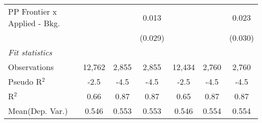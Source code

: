 \begin{tabular}{lcccccc}
   PP Frontier x Applied - Bkg.   &                &              & 0.013          &                &              & 0.023\\   
                                  &                &              & (0.029)        &                &              & (0.030)\\   
   \midrule
   \emph{Fit statistics}\\
   Observations                   & 12,762         & 2,855        & 2,855          & 12,434         & 2,760        & 2,760\\  
   Pseudo R$^2$                   & -2.5           & -4.5         & -4.5           & -2.5           & -4.5         & -4.5\\  
   R$^2$                          & 0.66           & 0.87         & 0.87           & 0.65           & 0.87         & 0.87\\  
Mean(Dep. Var.) & 0.546 & 0.553 & 0.553 & 0.546 & 0.554 & 0.554 \\
   

\end{tabular}
